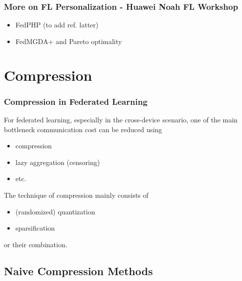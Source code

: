 
\begin{frame}
\frametitle{More on FL Personalization - Huawei Noah FL Workshop}

\begin{itemize}
    \item {\color{red} FedPHP (to add ref. latter)}
    \item {\color{red} FedMGDA+\cite{hu2020fedmgda+} and Pareto optimality}
\end{itemize}


\end{frame}


\section{Compression}


\begin{frame}
\frametitle{Compression in Federated Learning}

For federated learning, especially in the cross-device scenario, one of the main bottleneck {\color{red} communication cost} can be reduced using
\begin{itemize}
    \item compression
    \item {lazy aggregation (censoring)}
    \item {etc.}
\end{itemize}

\pause
\vspace{0.6em}

The technique of compression mainly consists of
\begin{itemize}
    \item (randomized) quantization
    \item sparsification
\end{itemize}
or their combination.

\end{frame}


\subsection{Naive Compression Methods}

